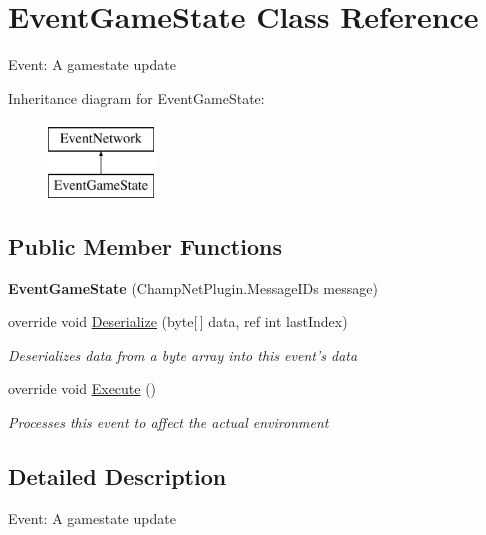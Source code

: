 \hypertarget{class_event_game_state}{\section{Event\-Game\-State Class Reference}
\label{class_event_game_state}
}


Event\-: A gamestate update  


Inheritance diagram for Event\-Game\-State\-:\begin{figure}[H]
\begin{center}
\leavevmode
\includegraphics[height=2.000000cm]{class_event_game_state}
\end{center}
\end{figure}
\subsection*{Public Member Functions}
\begin{DoxyCompactItemize}
\item 
\hypertarget{class_event_game_state_a34fd6692a15dabe770011dfe4d65057c}{{\bfseries Event\-Game\-State} (Champ\-Net\-Plugin.\-Message\-I\-Ds message)}\label{class_event_game_state_a34fd6692a15dabe770011dfe4d65057c}

\item 
override void \hyperlink{class_event_game_state_ac8d792c7dea5e0d703d317a66bcd4cdf}{Deserialize} (byte\mbox{[}$\,$\mbox{]} data, ref int last\-Index)
\begin{DoxyCompactList}\small\item\em Deserializes data from a byte array into this event's data \end{DoxyCompactList}\item 
override void \hyperlink{class_event_game_state_a9cf710bdb22c50a1e3af2615508861b6}{Execute} ()
\begin{DoxyCompactList}\small\item\em Processes this event to affect the actual environment \end{DoxyCompactList}\end{DoxyCompactItemize}


\subsection{Detailed Description}
Event\-: A gamestate update 

